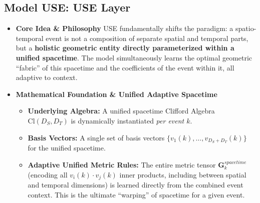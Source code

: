 \documentclass[11pt]{article}
\newcommand{\Cl}[2]{\text{Cl}(#1, #2)} %
\newcommand{\Ds}{D_S} %
\newcommand{\Dt}{D_T} %
\newenvironment{modeldescription}[1]{%
    \subsection*{Model #1: \MakeUppercase{#1} Layer}%
    \begin{itemize}[leftmargin=*,noitemsep]%
}{%
    \end{itemize}%
}
\begin{document}
\clearpage

\begin{modeldescription}{USE}
    \item \textbf{Core Idea \& Philosophy}
    USE fundamentally shifts the paradigm: a spatio-temporal event is not a composition of separate spatial and temporal parts, but a \textbf{holistic geometric entity directly parameterized within a unified spacetime}. The model simultaneously learns the optimal geometric ``fabric'' of this spacetime and the coefficients of the event within it, all adaptive to context.

    \item \textbf{Mathematical Foundation \& Unified Adaptive Spacetime}
    \begin{itemize}[noitemsep]
        \item \textbf{Underlying Algebra:} A unified spacetime Clifford Algebra $\Cl{\Ds}{\Dt}$ is dynamically instantiated \textit{per event $k$}.
        \item \textbf{Basis Vectors:} A single set of basis vectors $\{v_1(k), \dots, v_{\Ds+\Dt}(k)\}$ for the unified spacetime.
        \item \textbf{Adaptive Unified Metric Rules:} The entire metric tensor $\mathbf{G}_k^{spacetime}$ (encoding all $v_i(k) \cdot v_j(k)$ inner products, including between spatial and temporal dimensions) is learned directly from the combined event context. This is the ultimate ``warping'' of spacetime for a given event.
    \end{itemize}


\end{modeldescription}
\end{document}
